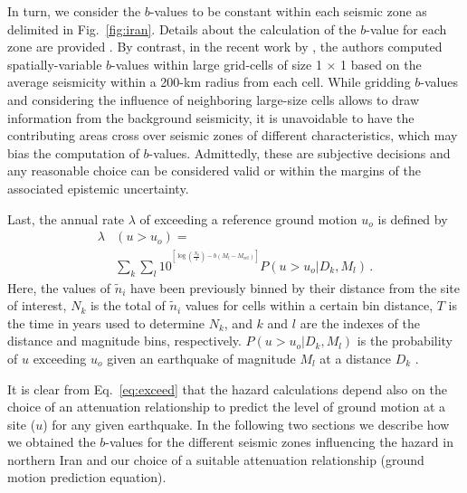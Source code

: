 In turn, we consider the $b$-values to be constant within each seismic zone as delimited in Fig.~\ref{fig:iran}. Details about the calculation of the $b$-value for each zone are provided . By contrast, in the recent work by \citet{Khodaverdian_2016_BSSA}, the authors computed spatially-variable $b$-values within large grid-cells of size 1\textdegree{} $\times$ 1\textdegree{} based on the average seismicity within a 200-km radius from each cell. While gridding $b$-values and considering the influence of neighboring large-size cells allows  to draw information from the background seismicity, it is unavoidable to have the contributing areas cross over seismic zones of different characteristics, which may bias the computation of $b$-values. Admittedly, these are subjective decisions and any reasonable choice can be considered valid or within the margins of the associated epistemic uncertainty.

Last, the annual rate $\lambda$ of exceeding a reference ground motion $u_o$ is defined by
% 
\begin{align}
	\lambda & \left( u > u_o \right) = \nonumber \\
		& \sum_{k} \sum_{l} 10^{ {}^{ \left[ \log \left( \frac{ N_{k} }{ T } \right) - b \left( M_l - M_{\mathrm{ref}} \right) \right] } }
		P \left( u > u_o | D_k , M_l \right)
		\, .
	\label{eq:exceed}
\end{align}
% 
Here, the values of $\tilde{n}_i$ have been previously binned by their distance from the site of interest, $N_k$ is the total of $\tilde{n}_i$ values for cells within a certain bin distance, $T$ is the time in years used to determine $N_k$, and $k$ and $l$ are the indexes of the distance and magnitude bins, respectively. $P ( u > u_o | D_k , M_l )$ is the probability of $u$ exceeding $u_o$ given an earthquake of magnitude $M_l$ at a distance $D_k$ \citep{Frankel1995}.

It is clear from Eq.~\ref{eq:exceed} that the hazard calculations depend also on the choice of an attenuation relationship to predict the level of ground motion at a site ($u$) for any given earthquake. In the following two sections we describe how we obtained the $b$-values for the different seismic zones influencing the hazard in northern Iran and our choice of a suitable attenuation relationship (ground motion prediction equation).

